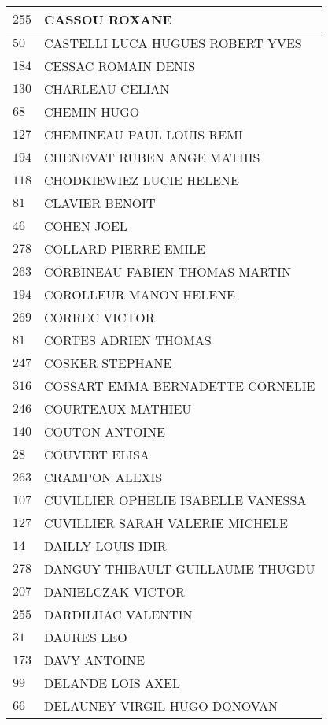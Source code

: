 \begin{xltabular}{\linewidth}{|l|X|}
    \hline
    $255$ & CASSOU ROXANE \\
    \hline
    $50$ & CASTELLI LUCA HUGUES ROBERT YVES \\
    \hline
    $184$ & CESSAC ROMAIN DENIS \\
    \hline
    $130$ & CHARLEAU CELIAN \\
    \hline
    $68$ & CHEMIN HUGO \\
    \hline
    $127$ & CHEMINEAU PAUL LOUIS REMI \\
    \hline
    $194$ & CHENEVAT RUBEN ANGE MATHIS \\
    \hline
    $118$ & CHODKIEWIEZ LUCIE HELENE \\
    \hline
    $81$ & CLAVIER BENOIT \\
    \hline
    $46$ & COHEN JOEL \\
    \hline
    $278$ & COLLARD PIERRE EMILE \\
    \hline
    $263$ & CORBINEAU FABIEN THOMAS MARTIN \\
    \hline
    $194$ & COROLLEUR MANON HELENE \\
    \hline
    $269$ & CORREC VICTOR \\
    \hline
    $81$ & CORTES ADRIEN THOMAS \\
    \hline
    $247$ & COSKER STEPHANE \\
    \hline
    $316$ & COSSART EMMA BERNADETTE CORNELIE \\
    \hline
    $246$ & COURTEAUX MATHIEU \\
    \hline
    $140$ & COUTON ANTOINE \\
    \hline
    $28$ & COUVERT ELISA \\
    \hline
    $263$ & CRAMPON ALEXIS \\
    \hline
    $107$ & CUVILLIER OPHELIE ISABELLE VANESSA \\
    \hline
    $127$ & CUVILLIER SARAH VALERIE MICHELE \\
    \hline
    $14$ & DAILLY LOUIS IDIR \\
    \hline
    $278$ & DANGUY THIBAULT GUILLAUME THUGDU \\
    \hline
    $207$ & DANIELCZAK VICTOR \\
    \hline
    $255$ & DARDILHAC VALENTIN \\
    \hline
    $31$ & DAURES LEO \\
    \hline
    $173$ & DAVY ANTOINE \\
    \hline
    $99$ & DELANDE LOIS AXEL \\
    \hline
    $66$ & DELAUNEY VIRGIL HUGO DONOVAN \\

\end{xltabular}
